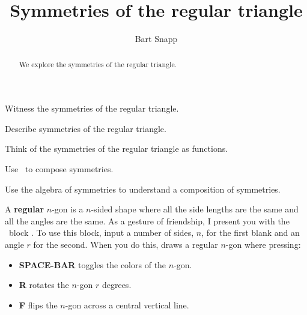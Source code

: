 \documentclass[noauthor,nooutcomes,hints,handout]{ximera}
\title{Symmetries of the regular triangle}
\author{Bart Snapp}
\begin{document}
\begin{abstract}
  We explore the symmetries of the regular triangle.
\end{abstract}
\maketitle

\begin{listOutcomes}
\item Witness the symmetries of the regular triangle.
\item Describe symmetries of the regular triangle.
\item Think of the symmetries of the regular triangle as functions.
\item Use \snap\ to compose symmetries.
\item Use the algebra of symmetries to understand a composition of
  symmetries.
\end{listOutcomes}


A \textbf{regular} $n$-gon is a $n$-sided shape where all the side
lengths are the same and all the angles are the same. As a gesture of
friendship, I present you with the \snap\ block
. To
use this block, input a number of sides, $n$, for the first blank and
an angle $r$ for the second. When you do this,
draws a regular $n$-gon where pressing:
\begin{itemize}
\item \textbf{SPACE-BAR} toggles the colors of the $n$-gon.
\item \textbf{R} rotates the $n$-gon $r$ degrees.
\item \textbf{F} flips the $n$-gon across a central vertical line.
\end{itemize}



\mynewpage
\end{document}
